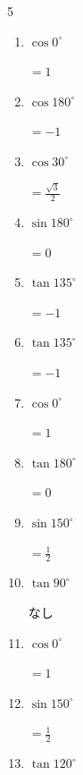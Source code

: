 \begin{multicols}{5}
\begin{enumerate}
        $\displaystyle =\frac{1}{\sqrt{3}}$

  \item $\displaystyle \cos{0^\circ}$

        $\displaystyle =1$

  \item $\displaystyle \cos{180^\circ}$

        $\displaystyle =-1$

  \item $\displaystyle \cos{30^\circ}$

        $\displaystyle =\frac{\sqrt{3}}{2}$

  \item $\displaystyle \sin{180^\circ}$

        $\displaystyle =0$

  \item $\displaystyle \tan{135^\circ}$

        $\displaystyle =-1$

\columnbreak %

\resetques

  \item $\displaystyle \tan{135^\circ}$

        $\displaystyle =-1$

  \item $\displaystyle \cos{0^\circ}$

        $\displaystyle =1$

  \item $\displaystyle \tan{180^\circ}$

        $\displaystyle =0$

  \item $\displaystyle \sin{150^\circ}$

        $\displaystyle =\frac{1}{2}$

  \item $\displaystyle \tan{90^\circ}$

        $\displaystyle なし$

  \item $\displaystyle \cos{0^\circ}$

        $\displaystyle =1$

  \item $\displaystyle \sin{150^\circ}$

        $\displaystyle =\frac{1}{2}$

  \item $\displaystyle \tan{120^\circ}$


\end{enumerate}
\end{multicols}
